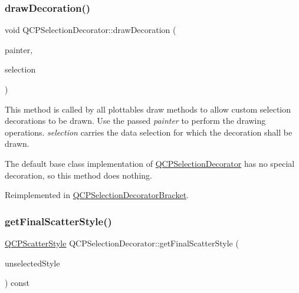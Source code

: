 \subsubsection{\texorpdfstring{draw\+Decoration()}{drawDecoration()}}
{\footnotesize\ttfamily void Q\+C\+P\+Selection\+Decorator\+::draw\+Decoration (\begin{DoxyParamCaption}\item[{\hyperlink{class_q_c_p_painter}{Q\+C\+P\+Painter} $\ast$}]{painter,  }\item[{\hyperlink{class_q_c_p_data_selection}{Q\+C\+P\+Data\+Selection}}]{selection }\end{DoxyParamCaption})\hspace{0.3cm}{\ttfamily [virtual]}}

This method is called by all plottables\textquotesingle{} draw methods to allow custom selection decorations to be drawn. Use the passed {\itshape painter} to perform the drawing operations. {\itshape selection} carries the data selection for which the decoration shall be drawn.

The default base class implementation of \hyperlink{class_q_c_p_selection_decorator}{Q\+C\+P\+Selection\+Decorator} has no special decoration, so this method does nothing. 

Reimplemented in \hyperlink{class_q_c_p_selection_decorator_bracket_a9ebe2e729b5012c0a995d788f87fac22}{Q\+C\+P\+Selection\+Decorator\+Bracket}.

\mbox{\label{class_q_c_p_selection_decorator_a1277b373248896bc70e8cc1de96da9fa}} 
\subsubsection{\texorpdfstring{get\+Final\+Scatter\+Style()}{getFinalScatterStyle()}}
{\footnotesize\ttfamily \hyperlink{class_q_c_p_scatter_style}{Q\+C\+P\+Scatter\+Style} Q\+C\+P\+Selection\+Decorator\+::get\+Final\+Scatter\+Style (\begin{DoxyParamCaption}\item[{const \hyperlink{class_q_c_p_scatter_style}{Q\+C\+P\+Scatter\+Style} \&}]{unselected\+Style }\end{DoxyParamCaption}) const}

